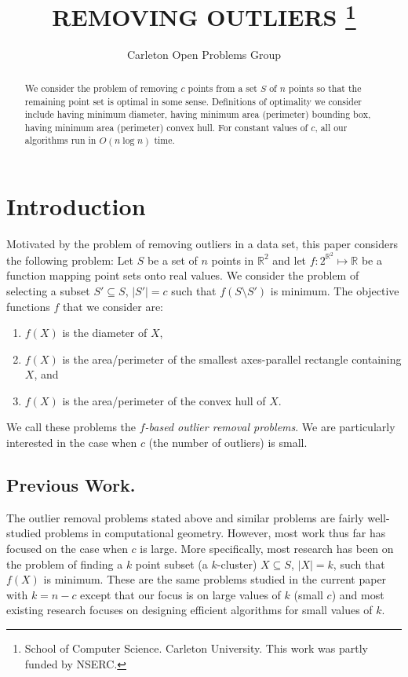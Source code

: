 \documentclass[lotsofwhite]{patmorin}
\title{
\MakeUppercase{Removing Outliers}%
\thanks{School of Computer Science. Carleton University. This work was partly funded by NSERC.}}
\author{Carleton Open Problems Group}
\date{}
\begin{document}
\maketitle

\begin{abstract}
We consider the problem of removing $c$ points from a set $S$ of $n$
points so that the remaining point set is optimal in some sense.
Definitions of optimality we consider include having minimum diameter,
having minimum area (perimeter) bounding box, having minimum area
(perimeter) convex hull.  For constant values of $c$, all our
algorithms run in $O(n\log n)$ time.
\end{abstract}

\newpage
\tableofcontents
\newpage

\section{Introduction}

Motivated by the problem of removing outliers in a data set, this
paper considers the following problem: Let $S$ be a set of $n$ points
in $\mathbb{R}^2$ and let $f:2^{\mathbb{R}^2}\mapsto \mathbb{R}$ be a
function mapping point sets onto real values.  We consider the problem
of selecting a subset $S'\subseteq S$, $|S'|=c$ such that
$f(S\setminus S')$ is minimum.  The objective functions $f$ that we
consider are:
\begin{enumerate}
\item $f(X)$ is the diameter of $X$,
\item $f(X)$ is the area/perimeter of the smallest axes-parallel
rectangle containing $X$, and
\item $f(X)$ is the area/perimeter of the convex hull of $X$.
\end{enumerate}  

We call these problems the \emph{$f$-based outlier removal problems}.
We are particularly interested in the case when $c$ (the number of
outliers) is small.

\subsection{Previous Work.} 

The outlier removal problems stated above and similar problems are
fairly well-studied problems in computational geometry.  However, most
work thus far has focused on the case when $c$ is large. More
specifically, most research has been on the problem of finding a $k$
point subset (a $k$-cluster) $X\subseteq S$, $|X|=k$, such that $f(X)$
is minimum. These are the same problems studied in the current paper
with $k=n-c$ except that our focus is on large values of $k$ (small
$c$) and most existing research focuses on designing efficient
algorithms for small values of $k$.
\end{document}
